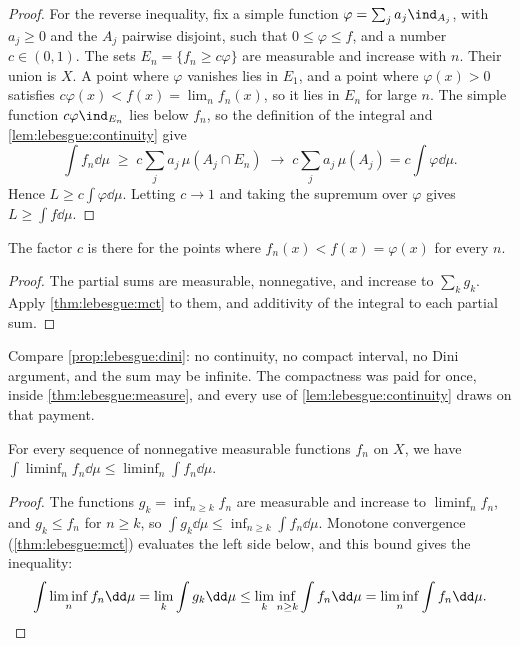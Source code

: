 \begin{refsection}
\begin{proof}
For the reverse inequality, fix a simple function $\varphi=\sum_ja_j\ind_{A_j}$, with $a_j\ge0$ and the $A_j$ pairwise disjoint, such that $0\le\varphi\le f$, and a number $c\in(0,1)$. The sets $E_n=\{f_n\ge c\varphi\}$ are measurable and increase with $n$. Their union is $X$. A point where $\varphi$ vanishes lies in $E_1$, and a point where $\varphi(x)>0$ satisfies $c\varphi(x)<f(x)=\lim_nf_n(x)$, so it lies in $E_n$ for large $n$. The simple function $c\varphi\ind_{E_n}$ lies below $f_n$, so the definition of the integral and \cref{lem:lebesgue:continuity} give
\[
  \int f_n\dd\mu\;\ge\;c\sum_ja_j\,\mu(A_j\cap E_n)\;\longrightarrow\;c\sum_ja_j\,\mu(A_j)=c\int\varphi\dd\mu .
\]
Hence $L\ge c\int\varphi\dd\mu$. Letting $c\to1$ and taking the supremum over $\varphi$ gives $L\ge\int f\dd\mu$.
\end{proof}

The factor $c$ is there for the points where $f_n(x)<f(x)=\varphi(x)$ for every $n$.


\begin{proof}
The partial sums are measurable, nonnegative, and increase to $\sum_kg_k$. Apply \cref{thm:lebesgue:mct} to them, and additivity of the integral to each partial sum.
\end{proof}

Compare \cref{prop:lebesgue:dini}: no continuity, no compact interval, no Dini argument, and the sum may be infinite. The compactness was paid for once, inside \cref{thm:lebesgue:measure}, and every use of \cref{lem:lebesgue:continuity} draws on that payment.

\begin{theorem}\label{thm:lebesgue:fatou}
For every sequence of nonnegative measurable functions $f_n$ on $X$, we have $\int\liminf_nf_n\dd\mu\le\liminf_n\int f_n\dd\mu$.
\end{theorem}

\begin{proof}
The functions $g_k=\inf_{n\ge k}f_n$ are measurable and increase to $\liminf_nf_n$, and $g_k\le f_n$ for $n\ge k$, so $\int g_k\dd\mu\le\inf_{n\ge k}\int f_n\dd\mu$. Monotone convergence (\cref{thm:lebesgue:mct}) evaluates the left side below, and this bound gives the inequality:
\[
  \int\liminf_nf_n\dd\mu=\lim_k\int g_k\dd\mu\le\lim_k\inf_{n\ge k}\int f_n\dd\mu=\liminf_n\int f_n\dd\mu. \qedhere
\]
\end{proof}


\end{refsection}
